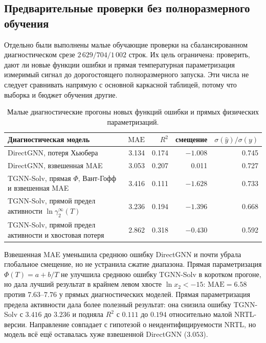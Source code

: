 \documentclass[11pt]{article}
\newcommand{\mae}{\mathrm{MAE}}
\newcommand{\Rtwo}{R^2}
\theoremstyle{definition}
\begin{document}
\subsection{Предварительные проверки без полноразмерного обучения}

Отдельно были выполнены малые обучающие проверки на сбалансированном диагностическом срезе \(2\,629/704/1\,002\) строк. Их цель ограничена: проверить, дают ли новые функции ошибки и прямая температурная параметризация измеримый сигнал до дорогостоящего полноразмерного запуска. Эти числа не следует сравнивать напрямую с основной каркасной таблицей, потому что выборка и бюджет обучения другие.

\begin{table}[!htbp]
\centering
\caption{Малые диагностические прогоны новых функций ошибки и прямых физических параметризаций.}
\label{tab:small-training-diagnostics}
\small
\begin{tabularx}{\textwidth}{P{0.40\textwidth}rrrr}
\toprule
Диагностическая модель & $\mae$ & $\Rtwo$ & смещение & $\sigma(\hat y)/\sigma(y)$ \\
\midrule
DirectGNN, потеря Хьюбера & 3.134 & 0.174 & $-1.008$ & 0.745 \\
DirectGNN, взвешенная MAE & 3.053 & 0.207 & 0.011 & 0.727 \\
TGNN-Solv, прямая \(\Phi\), Вант-Гофф и взвешенная MAE & 3.416 & 0.111 & $-1.628$ & 0.733 \\
TGNN-Solv, прямой предел активности \(\ln\gamma_2^\infty(T)\) & 3.236 & 0.194 & $-1.396$ & 0.668 \\
TGNN-Solv, прямой предел активности и хвостовая потеря & 2.862 & 0.318 & $-0.430$ & 0.592 \\
\bottomrule
\end{tabularx}
\end{table}

Взвешенная MAE уменьшила среднюю ошибку DirectGNN и почти убрала глобальное смещение, но не устранила сжатие диапазона. Прямая параметризация \(\Phi(T)=a+b/T\) не улучшила среднюю ошибку TGNN-Solv в коротком прогоне, но дала лучший результат в крайнем левом хвосте \(\ln x_2<-15\): \(\mae=6.58\) против \(7.63\)--\(7.76\) у прямых диагностических моделей. Прямая параметризация предела активности дала более полезный результат: она снизила ошибку TGNN-Solv с $3.416$ до $3.236$ и подняла $\Rtwo$ с $0.111$ до $0.194$ относительно малой NRTL-версии. Направление совпадает с гипотезой о неидентифицируемости NRTL, но модель всё ещё оставалась хуже взвешенной DirectGNN ($3.053$).
\end{document}
